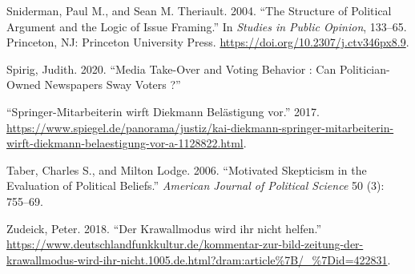 \documentclass[
  12pt,
]{article}
\newlength{\cslhangindent}
\newlength{\cslentryspacingunit} %
\newenvironment{CSLReferences}[2] %
 {%
  \setlength{\parindent}{0pt}
  \ifodd #1
  \let\oldpar\par
  \def\par{\hangindent=\cslhangindent\oldpar}
  \fi
  \setlength{\parskip}{#2\cslentryspacingunit}
 }%
 {}
\begin{document}
\begin{CSLReferences}{1}{0}
\leavevmode{}%
Sniderman, Paul M., and Sean M. Theriault. 2004. {``{The Structure of Political Argument and the Logic of Issue Framing}.''} In \emph{Studies in Public Opinion}, 133--65. Princeton, NJ: Princeton University Press. \url{https://doi.org/10.2307/j.ctv346px8.9}.

\leavevmode{}%
Spirig, Judith. 2020. {``{Media Take-Over and Voting Behavior : Can Politician-Owned Newspapers Sway Voters ?}''}

\leavevmode{}%
{``{Springer-Mitarbeiterin wirft Diekmann Bel{ä}stigung vor}.''} 2017. \url{https://www.spiegel.de/panorama/justiz/kai-diekmann-springer-mitarbeiterin-wirft-diekmann-belaestigung-vor-a-1128822.html}.

\leavevmode{}%
Taber, Charles S., and Milton Lodge. 2006. {``{Motivated Skepticism in the Evaluation of Political Beliefs}.''} \emph{American Journal of Political Science} 50 (3): 755--69.

\leavevmode{}%
Zudeick, Peter. 2018. {``{Der Krawallmodus wird ihr nicht helfen}.''} \url{https://www.deutschlandfunkkultur.de/kommentar-zur-bild-zeitung-der-krawallmodus-wird-ihr-nicht.1005.de.html?dram:article\%7B/_\%7Did=422831}.

\end{CSLReferences}
\end{document}
